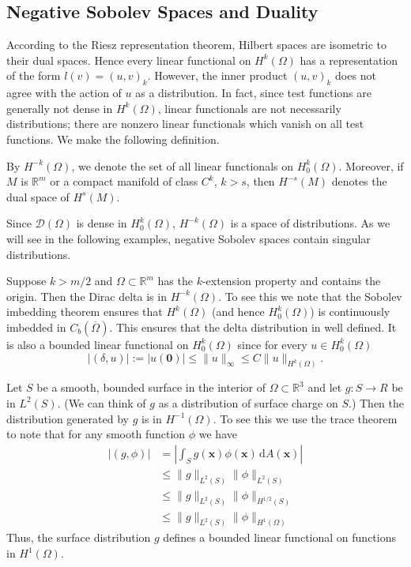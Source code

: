 \subsection{Negative Sobolev Spaces and Duality}\label{sec:negative-sobolev-duality}

According to the Riesz representation theorem, Hilbert spaces are isometric to their dual spaces. Hence every linear functional on $H^k(\Omega)$ has a representation of the form $l(v)=(u,v)_k$. However, the inner product $(u,v)_k$ does not agree with the action of $u$ as a distribution. In fact, since test functions are generally not dense in $H^k(\Omega)$, linear functionals are not necessarily distributions; there are nonzero linear functionals which vanish on all test functions. We make the following definition.

\begin{Definition}
\label{def:negative-order-sobolev-dual-spaces}
By $H^{-k}(\Omega)$, we denote the set of all linear functionals on $H_0^k(\Omega)$. Moreover, if $M$ is $\mathbb{R}^m$ or a compact manifold of class $C^k$, $k>s$, then $H^{-s}(M)$ denotes the dual space of $H^s(M)$.
\end{Definition}

Since $\mathcal{D}(\Omega)$ is dense in $H_0^k(\Omega)$, $H^{-k}(\Omega)$ is a space of distributions. As we will see in the following examples, negative Sobolev spaces contain singular distributions.

\begin{Example}
\label{ex:dirac-negative-sobolev-membership}
Suppose $k>m/2$ and $\Omega\subset\mathbb{R}^m$ has the $k$-extension property and contains the origin. Then the Dirac delta is in $H^{-k}(\Omega)$. To see this we note that the Sobolev imbedding theorem ensures that $H^k(\Omega)$ (and hence $H_0^k(\Omega)$) is continuously imbedded in $C_b(\overline\Omega)$. This ensures that the delta distribution in well defined. It is also a bounded linear functional on $H_0^k(\Omega)$ since for every $u\in H_0^k(\Omega)$\[|(\delta,u)|:=|u(\bm{0})|\leq\|u\|_{\infty}\leq C\|u\|_{H^k(\Omega)}.\]
\end{Example}

\begin{Example}
\label{ex:surface-charge-negative-sobolev}
Let $S$ be a smooth, bounded surface in the interior of $\Omega\subset\mathbb{R}^3$ and let $g:S\to R$ be in $L^2(S)$. (We can think of $g$ as a distribution of surface charge on $S$.) Then the distribution generated by $g$ is in $H^{-1}(\Omega)$. To see this we use the trace theorem to note that for any smooth function $\phi$ we have\[\begin{aligned}
|(g,\phi)|&=\left|\int_Sg(\bm{x})\phi(\bm{x})\,\mathrm{d}A(\bm{x})\right|\\
&\leq\|g\|_{L^2(S)}\|\phi\|_{L^2(S)}\\
&\leq\|g\|_{L^2(S)}\|\phi\|_{H^{1/2}(S)}\\
&\leq\|g\|_{L^2(S)}\|\phi\|_{H^1(\Omega)}
\end{aligned}\]Thus, the surface distribution $g$ defines a bounded linear functional on functions in $H^1(\Omega)$.
\end{Example}

